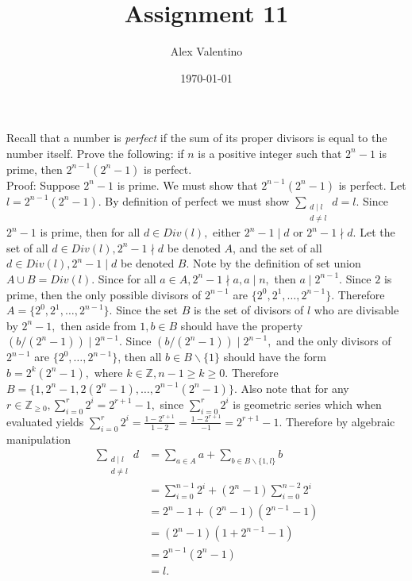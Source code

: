 \documentclass[12pt, letterpaper]{article}
\date{\today}
\author{Alex Valentino}
\title{Assignment 11}
\newcommand{\Z}{\mathbb{Z}}
\begin{document}
Recall that a number is {\em perfect} if the sum of its proper divisors
is equal to the number itself.  Prove the following: if $n$ is a positive integer such
that $2^n-1$ is prime, then $2^{n-1}(2^n-1)$ is perfect.\\

Proof: Suppose $2^n -1$ is prime.  We must show that $2^{n-1}(2^n-1)$ is perfect.  Let $l = 2^{n-1}(2^n-1)$.  By definition of perfect we must show $\sum_{\substack{d \mid l\\d \neq l}} d = l$.  Since $2^n - 1$ is prime, then for all $d \in Div(l),$ either $2^n -1 \mid d$ or $2^n - 1 \nmid d.$  Let the set of all $d \in Div(l), 2^n -1 \nmid d$ be denoted $A$, and the set of all $d \in Div(l), 2^n -1 \mid d$ be denoted $B$.  Note by the definition of set union $A \cup B = Div(l).$  Since for all $a \in A, 2^n - 1 \nmid a, a \mid n,$ then $a \mid 2^{n-1}.$  Since $2$ is prime, then the only possible divisors of $2^{n-1}$ are $\{2^0,2^1,\ldots,2^{n-1}\}.$  Therefore $A = \{2^0,2^1,\ldots,2^{n-1}\}$.  Since the set $B$ is the set of divisors of $l$ who are divisable by $2^n -1,$ then aside from $1, b \in B$ should have the property $(b/(2^n -1)) \mid 2^{n-1}.$  Since $(b/(2^n -1)) \mid 2^{n-1},$ and the only divisors of $2^{n-1}$ are $\{2^0,\ldots, 2^{n-1}\}$, then all $b \in B \backslash \{1\}$ should have the form $b=2^k(2^n - 1),$ where $k \in \Z, n-1 \geq k \geq 0.$ Therefore $B = \{1,2^n -1, 2(2^n - 1),\ldots, 2^{n-1}(2^n - 1)\}$.  Also note that for any $r \in \Z_{\geq 0}, \sum^r_{i=0} 2^i= 2^{r+1} - 1,$ since $\sum^r_{i=0} 2^i$ is geometric series which when evaluated yields $\sum^r_{i=0} 2^i = \frac{1-2^{r+1}}{1-2} = \frac{1-2^{r+1}}{-1} = 2^{r+1} - 1.$
Therefore by algebraic manipulation
\begin{align*}
\sum_{\substack{d \mid l\\d \neq l}} d &= \sum_{a \in A} a + \sum_{b \in B \backslash \{1,l\}}b\\
&= \sum_{i=0}^{n-1} 2^i + (2^n - 1)\sum^{n-2}_{i=0}2^i \\
&= 2^n - 1 + (2^n - 1)(2^{n-1} - 1)\\
&= (2^n -1)(1 + 2^{n-1} - 1)\\
&= 2^{n-1}(2^n -1)\\
&= l.
\end{align*}
\end{document}
